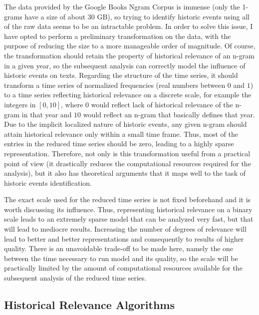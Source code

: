 The data provided by the Google Books Ngram Corpus is immense (only the 1-grams have a size of about 30 GB), so trying to identify historic events using all of the raw data seems to be an intractable problem. In order to solve this issue, I have opted to perform a preliminary transformation on the data, with the purpose of reducing the size to a more manageable order of magnitude. Of course, the transformation should retain the property of historical relevance of an n-gram in a given year, so the subsequent analysis can correctly model the influence of historic events on texts. Regarding the structure of the time series, it should transform a time series of normalized frequencies (real numbers between $0$ and $1$) to a time series reflecting historical relevance on a discrete scale, for example the integers in $\left[ 0, 10 \right]$, where $0$ would reflect lack of historical relevance of the n-gram in that year and $10$ would reflect an n-gram that basically defines that year. Due to the implicit localized nature of historic events, any given n-gram should attain historical relevance only within a small time frame. Thus, most of the entries in the reduced time series should be zero, leading to a highly sparse representation. Therefore, not only is this transformation useful from a practical point of view (it drastically reduces the computational resources required for the analysis), but it also has theoretical arguments that it maps well to the task of historic events identification.

The exact scale used for the reduced time series is not fixed beforehand and it is worth discussing its influence. Thus, representing historical relevance on a binary scale leads to an extremely sparse model that can be analyzed very fast, but that will lead to mediocre results. Increasing the number of degrees of relevance will lead to better and better representations and consequently to results of higher quality. There is an unavoidable trade-off to be made here, namely the one between the time necessary to run model and its quality, so the scale will be practically limited by the amount of computational resources available for the subsequent analysis of the reduced time series.

\subsection{Historical Relevance Algorithms}
\label{sec:historical-relevance-algorithms}


